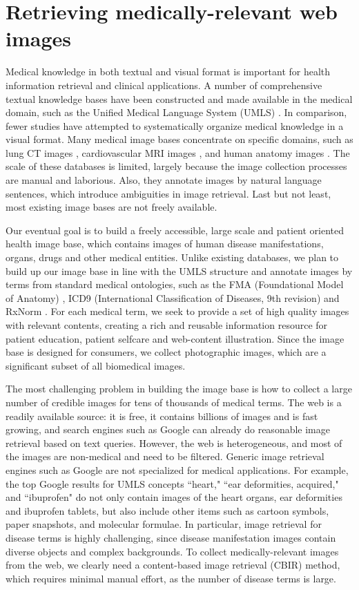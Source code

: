 
\section{Retrieving medically-relevant web images}
Medical knowledge in both textual and visual format is important for health information retrieval
and clinical applications. A number of comprehensive textual knowledge
bases have been constructed and made available in the medical domain,
such as the Unified Medical Language System (UMLS) {\cite{humphreys1998unified}}.
In comparison, fewer studies have attempted to systematically organize medical
knowledge in a visual format. Many medical image bases concentrate on specific domains, such as lung
CT images \cite{armato2004lung}, cardiovascular MRI images \cite{keator2008national},
and human anatomy images \cite{adma}. The scale of these databases
is limited, largely because the image collection processes are manual and laborious.
Also, they annotate images by natural language sentences,
which introduce ambiguities in image
retrieval. Last but not least, most existing image
bases are not freely available.

Our eventual goal is to build a freely accessible, large scale and patient
oriented health image base, which contains images of human disease
manifestations, organs, drugs and other medical entities.
Unlike existing databases, we plan to build up our image base in line with
the UMLS structure and annotate images by terms from
standard medical ontologies, such as the FMA (Foundational Model of
Anatomy) \cite{rosse2003reference}, ICD9 (International Classification of
Diseases, 9th revision) \cite{slee1978international} and RxNorm \cite{liu2005rxnorm}.
For each medical term,
we seek to provide a set of high quality images with relevant contents,
creating a rich and reusable information resource for patient education,
patient selfcare and web-content illustration.
Since the image base is designed for consumers, we
collect photographic images, which are a significant
subset of all biomedical images.


The most challenging problem in building the image base is
how to collect a large number of credible images for tens of thousands of medical terms.
The web is a readily available source: it is free, it contains billions of images
and is fast growing, and search engines such as Google can already do reasonable
image retrieval based on text queries. However, the web is heterogeneous, and most
of the images are non-medical and need to be filtered.
Generic image retrieval engines such as Google are not specialized for medical applications.
For example, the top Google results
for UMLS concepts ``heart," ``ear deformities,
acquired," and ``ibuprofen" do not only contain
images of the heart organs, ear deformities and ibuprofen
tablets, but also include other items such as
cartoon symbols, paper snapshots, and molecular
formulae. In particular, image retrieval for disease terms is
highly challenging, since disease manifestation
images contain diverse objects and complex backgrounds.
To collect medically-relevant images from the
web, we clearly need a content-based image
retrieval (CBIR) method, which requires minimal manual effort,
as the number of disease terms is large.


